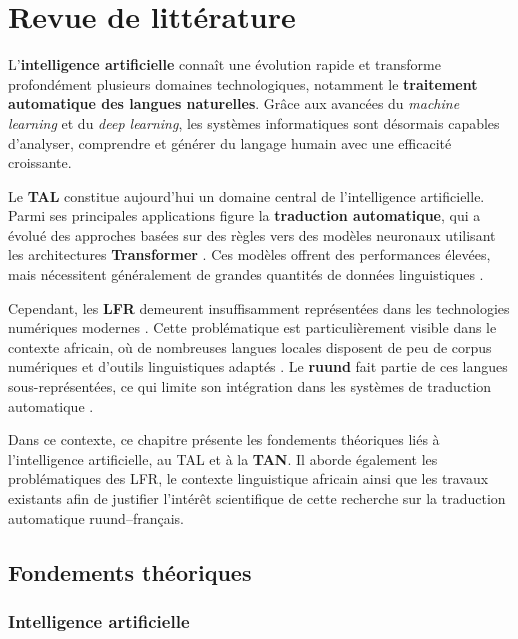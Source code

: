 \chapter{Revue de littérature}
L'\textbf{intelligence artificielle} connaît une évolution rapide et transforme profondément plusieurs domaines technologiques, notamment le \textbf{traitement automatique des langues naturelles}. Grâce aux avancées du \textit{machine learning} et du \textit{deep learning}, les systèmes informatiques sont désormais capables d'analyser, comprendre et générer du langage humain avec une efficacité croissante.

Le \textbf{\ac{TAL}} constitue aujourd'hui un domaine central de l'intelligence artificielle. Parmi ses principales applications figure la \textbf{traduction automatique}, qui a évolué des approches basées sur des règles vers des modèles neuronaux utilisant les architectures \textbf{Transformer} \cite{vaswani2017attention}. Ces modèles offrent des performances élevées, mais nécessitent généralement de grandes quantités de données linguistiques \cite{ranathunga2023neural}.

Cependant, les \textbf{\ac{LFR}} demeurent insuffisamment représentées dans les technologies numériques modernes \cite{ranathunga2023neural}. Cette problématique est particulièrement visible dans le contexte africain, où de nombreuses langues locales disposent de peu de corpus numériques et d'outils linguistiques adaptés \cite{agyei2024low}. Le \textbf{ruund} fait partie de ces langues sous-représentées, ce qui limite son intégration dans les systèmes de traduction automatique \cite{haulai2023construction}.

Dans ce contexte, ce chapitre présente les fondements théoriques liés à l'intelligence artificielle, au \ac{TAL} et à la \textbf{\ac{TAN}}. Il aborde également les problématiques des \ac{LFR}, le contexte linguistique africain ainsi que les travaux existants afin de justifier l'intérêt scientifique de cette recherche sur la traduction automatique ruund--français.


\section{Fondements théoriques}

\subsection{Intelligence artificielle}

